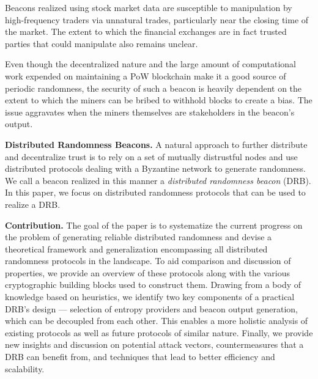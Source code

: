 \documentclass[letterpaper,twocolumn,10pt]{article}
\theoremstyle{definition}
\theoremstyle{remark}
\begin{document}
Beacons realized using stock market data are susceptible to manipulation by high-frequency traders via unnatural trades, particularly near the closing time of the market. The extent to which the financial exchanges are in fact trusted parties that could manipulate also remains unclear.

Even though the decentralized nature and the large amount of computational work expended on maintaining a PoW blockchain make it a good source of periodic randomness, the security of such a beacon is heavily dependent on the extent to which the miners can be bribed to withhold blocks to create a bias. The issue aggravates when the miners themselves are stakeholders in the beacon's output.

\textbf{Distributed Randomness Beacons.}
A natural approach to further distribute and decentralize trust is to rely on a set of mutually distrustful nodes and use distributed protocols dealing with a Byzantine network to generate randomness. We call a beacon realized in this manner a \textit{distributed randomness beacon} (DRB). In this paper, we focus on distributed randomness protocols that can be used to realize a DRB.

\textbf{Contribution.} The goal of the paper is to systematize the current progress on the problem of generating reliable distributed randomness and devise a theoretical framework and generalization encompassing all distributed randomness protocols in the landscape. To aid comparison and discussion of properties, we provide an overview of these protocols along with the various cryptographic building blocks used to construct them. Drawing from a body of knowledge based on heuristics, we identify two key components of a practical DRB's design --- selection of entropy providers and beacon output generation, which can be decoupled from each other. This enables a more holistic analysis of existing protocols as well as future protocols of similar nature. Finally, we provide new insights and discussion on potential attack vectors, countermeasures that a DRB can benefit from, and techniques that lead to better efficiency and scalability.
\end{document}

